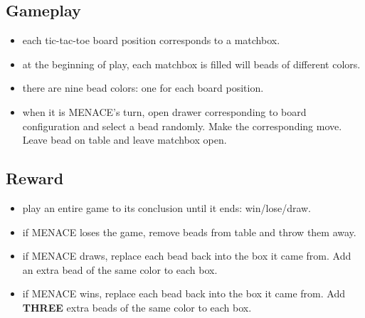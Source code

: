 \documentclass[journal, compsoc]{IEEEtran}
\begin{document}
\subsection{Gameplay}
\begin{itemize}
\item each tic-tac-toe board position corresponds to a matchbox.
\item at the beginning of play, each matchbox is filled will beads of different colors.
\item there are nine bead colors: one for each board position.
\item when it is MENACE’s turn, open drawer corresponding to board configuration
 and select a bead randomly. Make the corresponding move. Leave bead on
 table and leave matchbox open.

\end{itemize}

\subsection{Reward}
\begin{itemize}
\item play an entire game to its conclusion until it ends: win/lose/draw.
\item if MENACE loses the game, remove beads from table and throw them away.
\item if MENACE draws, replace each bead back into the box it came from. Add an
 extra bead of the same color to each box.
\item if MENACE wins, replace each bead back into the box it came from. Add \textbf{THREE} extra beads of the same color to each box.
\end{itemize}
\end{document}

